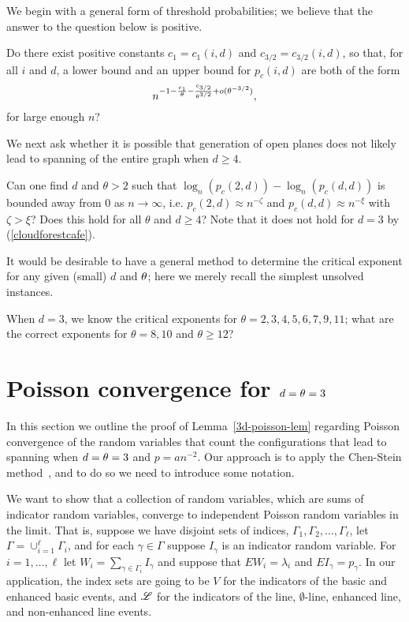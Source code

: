 We begin with a general form of threshold probabilities; we believe that the answer to the question 
below is positive.

\begin{question} Do there exist positive constants  $c_1=c_1(i,d)$ and $c_{3/2}=c_{3/2}(i,d)$, so that, for
all $i$ and $d$, a lower bound and an upper bound for $p_c(i,d)$ are both  of the form 
$$n^{-1 - \frac{c_1}{\theta} - \frac{c_{3/2}}{\theta^{3/2}}+o(\theta^{-3/2})},$$
for large enough $n$?
\end{question}

We next ask whether it is possible that generation of open planes  
does not likely lead to spanning of the entire graph when $d\geq 4$.

\begin{question}
Can one find $d$ and $\theta>2$ such that $\log_n(p_c(2,d))-\log_n(p_c(d,d))$ is bounded away from 0 as $n \to \infty$, i.e. $p_c(2,d)\approx n^{-\zeta}$ and $p_c(d,d)\approx n^{-\xi}$
with $\zeta>\xi$? Does this hold for all $\theta$ and $d \geq 4$? Note that it does not hold for $d=3$ by (\ref{cloudforestcafe}).
\end{question}

It would be desirable to have a general method to determine the critical exponent for any given 
(small) $d$ and $\theta$;
here we merely recall the simplest unsolved instances. 


\begin{question}
When $d=3$, we know the critical exponents for $\theta = 2,3,4,5,6,7,9,11$;  
what are the correct exponents for $\theta = 8, 10$ and $\theta \geq 12$?
\end{question}

\section{Poisson convergence for $d=\theta=3$}
\label{ap:poisson}
In this section we outline the proof of Lemma~\ref{3d-poisson-lem} regarding Poisson convergence of the random variables that count the configurations that lead to spanning when $d=\theta=3$ and $p = an^{-2}$.  Our approach is to apply the Chen-Stein method~\cite{poissonbook}, and to do so we need to introduce some notation.

We want to show that a collection of random variables, which are sums of indicator random variables, converge to independent Poisson random variables in the limit.  That is, suppose we have disjoint sets of indices, $\Gamma_1, \Gamma_2, \ldots, \Gamma_\ell$, let $\Gamma = \cup_{i=1}^\ell \Gamma_i$, and for each $\gamma \in \Gamma$ suppose $I_\gamma$ is an indicator random variable.  For $i=1, \ldots, \ell$ let $W_i = \sum_{\gamma\in \Gamma_i} I_\gamma$ and suppose that $EW_i = \lambda_i$ and $EI_\gamma = p_\gamma$.  In our application, the index sets are going to be $V$ for the indicators of the basic and enhanced basic events, and $\mathscr{L}$ for the indicators of the line, $\emptyset$-line, enhanced line, and non-enhanced line events.


